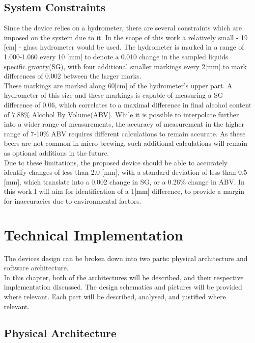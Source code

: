 \documentclass[twoside]{ctuthesis}
\theoremstyle{plain}
\theoremstyle{definition}
\theoremstyle{note}
\begin{document}
\section{System Constraints}
Since the device relies on a hydrometer, there are several constraints which are imposed on the system due to it. In the scope of this work a relatively small - 19 [cm] - glass hydrometer would be used. The hydrometer is marked in a range of 1.000-1.060 every 10 [mm] to denote a 0.010 change in the sampled liquids specific gravity(SG), with four additional smaller markings every 2[mm] to mark differences of 0.002 between the larger marks.\\
These markings are marked along 60[cm] of the hydrometer's upper part. A hydrometer of this size and these markings is capable of measuring a SG difference of 0.06, which correlates to a maximal difference in final alcohol content of 7.88$\%$ Alcohol By Volume(ABV). While it is possible to interpolate further into a wider range of measurements, the accuracy of measurement in the higher range of 7-10$\%$ ABV requires different calculations to remain accurate\cite{Joy_Of_Brewing}. As these beers are not common in micro-brewing, such additional calculations will remain as optional additions in the future.\\
Due to these limitations, the proposed device should be able to accurately identify changes of less than 2.0 [mm], with a standard deviation of less than 0.5 [mm], which translate into a 0.002 change in SG, or a 0.26$\%$ change in ABV. In this work I will aim for identification of a 1[mm] difference, to provide a margin for inaccuracies due to environmental factors.


\pagebreak

\begingroup
\renewcommand{\cleardoublepage}{}
\renewcommand{\clearpage}{}
\chapter{Technical Implementation}
\endgroup

The devices design can be broken down into two parts: physical architecture and software architecture.\\
In this chapter, both of the architectures will be described, and their respective implementation discussed. The design schematics and pictures will be provided where relevant. Each part will be described, analysed, and justified where relevant.

\section{Physical Architecture}
\end{document}
